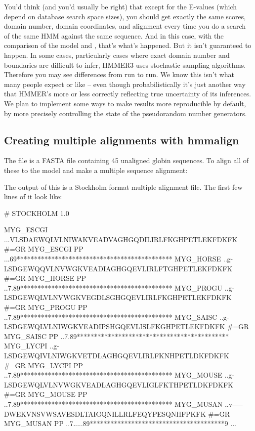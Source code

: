 You'd think (and you'd usually be right) that except for the E-values
(which depend on database search space sizes), you should get exactly
the same scores, domain number, domain coordinates, and alignment
every time you do a search of the same HMM against the same
sequence. And in this case, with the comparison of the 
model and , that's what's happened. But it isn't
guaranteed to happen. In some cases, particularly cases where exact
domain number and boundaries are difficult to infer, HMMER3 uses
stochastic sampling algorithms. Therefore you may see differences from
run to run. We know this isn't what many people expect or like -- even
though probabilistically it's just another way that HMMER's more or
less correctly reflecting true uncertainty of its inferences. We plan
to implement some ways to make results more reproducible by default,
by more precisely controlling the state of the pseudorandom number
generators.



\subsection{Creating multiple alignments with hmmalign}

The file  is a FASTA file containing 45
unaligned globin sequences. To align all of these to the
 model and make a multiple sequence alignment:


The output of this is a Stockholm format multiple alignment file. The
first few lines of it look like:

\begin{sreoutput}
# STOCKHOLM 1.0

MYG_ESCGI          ...VLSDAEWQLVLNIWAKVEADVAGHGQDILIRLFKGHPETLEKFDKFK
#=GR MYG_ESCGI  PP ...69*********************************************
MYG_HORSE          ..g-LSDGEWQQVLNVWGKVEADIAGHGQEVLIRLFTGHPETLEKFDKFK
#=GR MYG_HORSE  PP ..7.89********************************************
MYG_PROGU          ..g-LSDGEWQLVLNVWGKVEGDLSGHGQEVLIRLFKGHPETLEKFDKFK
#=GR MYG_PROGU  PP ..7.89********************************************
MYG_SAISC          ..g-LSDGEWQLVLNIWGKVEADIPSHGQEVLISLFKGHPETLEKFDKFK
#=GR MYG_SAISC  PP ..7.89********************************************
MYG_LYCPI          ..g-LSDGEWQIVLNIWGKVETDLAGHGQEVLIRLFKNHPETLDKFDKFK
#=GR MYG_LYCPI  PP ..7.89********************************************
MYG_MOUSE          ..g-LSDGEWQLVLNVWGKVEADLAGHGQEVLIGLFKTHPETLDKFDKFK
#=GR MYG_MOUSE  PP ..7.89********************************************
MYG_MUSAN          ..v-----DWEKVNSVWSAVESDLTAIGQNILLRLFEQYPESQNHFPKFK
#=GR MYG_MUSAN  PP ..7.....89***************************************9
...
\end{sreoutput}

